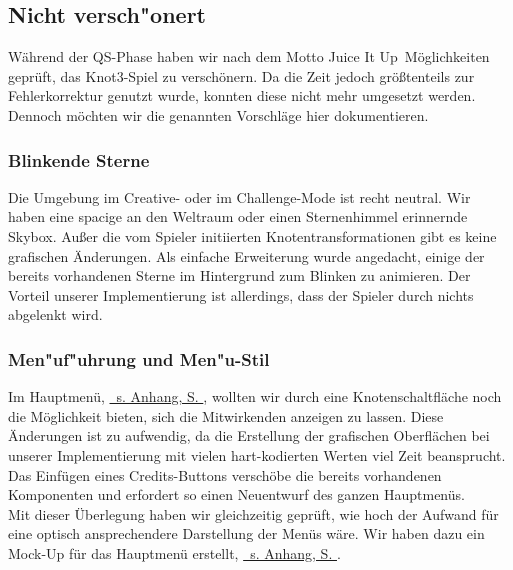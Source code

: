%



\newpage



\subsection{Nicht versch{"o}nert} %
\label{Abschnitt:Aenderungen:Protokoll:Verschoenerungen:Nicht}

Während der QS-Phase haben wir nach dem Motto \glqq Juice It Up\grqq~Möglichkeiten geprüft, das Knot3-Spiel zu verschönern. Da die Zeit jedoch größtenteils zur Fehlerkorrektur genutzt wurde, konnten diese nicht mehr umgesetzt werden. Dennoch möchten wir die genannten Vorschläge hier dokumentieren.\\


\subsubsection*{Blinkende Sterne}
\label{Abschnitt:Aenderungen:Protokoll:Verschoenerungen:Nicht:Blinkende_Sterne}

Die Umgebung im Creative- oder im Challenge-Mode ist recht neutral. Wir haben eine spacige an den Weltraum oder einen Sternenhimmel erinnernde Skybox. Außer die vom Spieler initiierten Knotentransformationen gibt es keine grafischen Änderungen. Als einfache Erweiterung wurde angedacht, einige der bereits vorhandenen Sterne im Hintergrund zum Blinken zu animieren. Der Vorteil unserer Implementierung ist allerdings, dass der Spieler durch nichts abgelenkt wird.\\

\subsubsection*{Men{"u}f{"u}hrung und Men{"u}-Stil}
\label{Abschnitt:Aenderungen:Protokoll:Verschoenerungen:Nicht:Menues}

Im Hauptmenü, \hyperref[Abschnitt:Anhang:Aenderungen:Nicht]{ \mousecursor~s. Anhang, S. \pageref{Abschnitt:Anhang:Aenderungen:Nicht}}, wollten wir durch eine Knotenschaltfläche noch die Möglichkeit bieten, sich die Mitwirkenden anzeigen zu lassen. Diese Änderungen ist zu aufwendig, da die Erstellung der grafischen Oberflächen bei unserer Implementierung mit vielen hart-kodierten Werten viel Zeit beansprucht. Das Einfügen eines Credits-Buttons verschöbe die bereits vorhandenen Komponenten und erfordert so einen Neuentwurf des ganzen Hauptmenüs.\\

Mit dieser Überlegung haben wir gleichzeitig geprüft, wie hoch der Aufwand für eine optisch ansprechendere Darstellung der Menüs wäre. Wir haben dazu ein Mock-Up für das Hauptmenü erstellt, \hyperref[Abschnitt:Anhang:Aenderungen:Nicht]{ \mousecursor~s. Anhang, S. \pageref{Abschnitt:Anhang:Aenderungen:Nicht}}.\\







